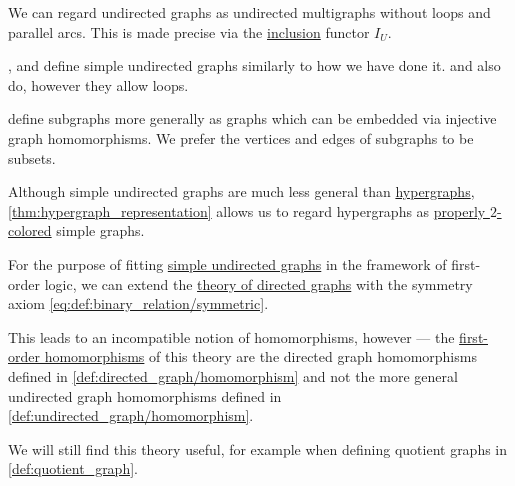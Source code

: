 \begin{comments}
  \item We can regard undirected graphs as undirected multigraphs without loops and parallel arcs. This is made precise via the \hyperref[con:inclusion_and_projection]{inclusion} functor \hyperref[def:graph_functors/undirected_inclusion]{\( I_U \)}.

  \item {},  and  define simple undirected graphs similarly to how we have done it.  and  also do, however they allow loops.

  \item {} define subgraphs more generally as graphs which can be embedded via injective graph homomorphisms. We prefer the vertices and edges of subgraphs to be subsets.

  \item Although simple undirected graphs are much less general than \hyperref[def:hypergraph]{hypergraphs}, \cref{thm:hypergraph_representation} allows us to regard hypergraphs as \hyperref[def:graph_coloring/proper]{properly \( 2 \)-colored} simple graphs.
\end{comments}

\begin{remark}\label{rem:theory_of_simple_undirected_graphs}
  For the purpose of fitting \hyperref[def:undirected_graph]{simple undirected graphs} in the framework of first-order logic, we can extend the \hyperref[def:directed_graph/theory]{theory of directed graphs} with the symmetry axiom \eqref{eq:def:binary_relation/symmetric}.

  This leads to an incompatible notion of homomorphisms, however --- the \hyperref[def:first_order_homomorphism]{first-order homomorphisms} of this theory are the directed graph homomorphisms defined in \cref{def:directed_graph/homomorphism} and not the more general undirected graph homomorphisms defined in \cref{def:undirected_graph/homomorphism}.

  We will still find this theory useful, for example when defining quotient graphs in \cref{def:quotient_graph}.
\end{remark}

